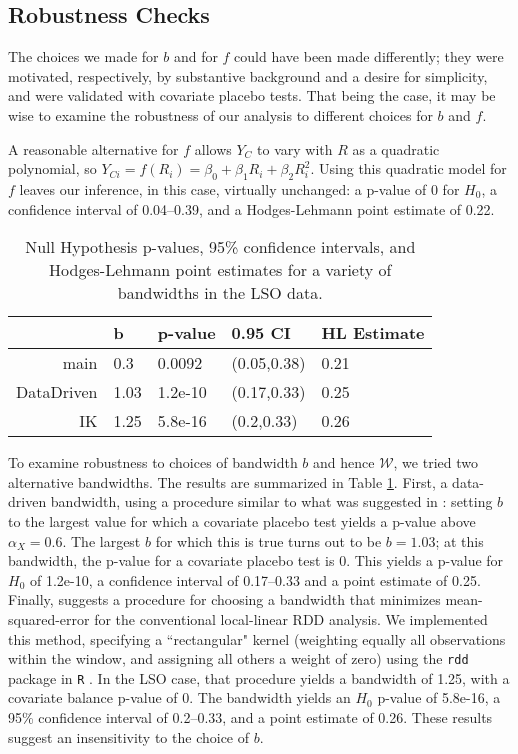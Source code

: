 \documentclass[12pt]{article}
\begin{document}
\subsection{Robustness Checks}

The choices we made for $b$ and for $f$ could have been made
differently; they were motivated, respectively, by substantive
background and a desire for simplicity, and were validated with
covariate placebo tests.
That being the case, it may be wise to examine the robustness of our
analysis to different choices for $b$ and $f$.

A reasonable alternative for $f$ allows $Y_C$ to vary with $R$ as a
quadratic polynomial, so $Y_{Ci}=f(R_i)=\beta_0+\beta_1 R_i+\beta_2
R_i^2$.
Using this quadratic model for $f$ leaves our inference, in this case,
virtually unchanged: a p-value of 0 for $H_0$, a confidence
interval of 0.04--0.39, and a Hodges-Lehmann
point estimate of 0.22.

\begin{table}[ht]
\centering
\begin{tabular}{rllll}
  \hline
 & b & p-value & 0.95 CI & HL Estimate \\ 
  \hline
main & 0.3 & 0.0092 & (0.05,0.38) & 0.21 \\ 
  DataDriven & 1.03 & 1.2e-10 & (0.17,0.33) & 0.25 \\ 
  IK & 1.25 & 5.8e-16 & (0.2,0.33) & 0.26 \\ 
   \hline
\end{tabular}
\caption{Null Hypothesis p-values, 95\% confidence intervals, and Hodges-Lehmann point estimates for a variety of bandwidths in the LSO data.} 
\label{bandwidths}
\end{table}
To examine robustness to choices of bandwidth $b$ and hence
$\mathcal{W}$, we tried two alternative bandwidths.
The results are summarized in Table \ref{bandwidths}.
First, a data-driven bandwidth, using a procedure similar to what was
suggested in \citet{rocio}: setting $b$ to the largest value for which
a covariate placebo test yields a p-value above $\alpha_X=0.6$.
The largest $b$ for which this is true turns out to be $b=1.03$; at this bandwidth, the p-value for a covariate placebo test is 0.
This yields a p-value for $H_0$ of 1.2e-10, a confidence interval of 0.17--0.33 and a point estimate of 0.25.
Finally, \citet{imbens2012optimal} suggests a procedure for choosing a bandwidth that minimizes mean-squared-error for the conventional local-linear RDD analysis.
We implemented this method, specifying a ``rectangular" kernel (weighting equally all observations within the window, and assigning all others a weight of zero) using the \verb|rdd| package in \verb|R| \citep{Rcite,rdd}. %
In the LSO case, that procedure yields a bandwidth of 1.25, with a covariate balance p-value of 0.
The \citet{imbens2012optimal} bandwidth yields an $H_0$ p-value of 5.8e-16, a 95\% confidence interval of 0.2--0.33, and a point estimate of 0.26.
These results suggest an insensitivity to the choice of $b$.
\end{document}
